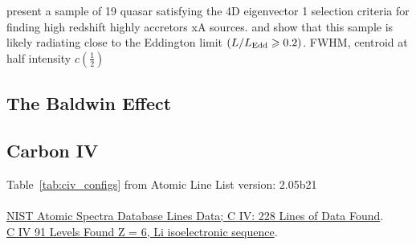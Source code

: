 \documentclass[a4paper,fleqn,usenatbib]{mnras}
\begin{document}
\citet{Martinez-Aldama2018} 
present a sample of 19 quasar satisfying the 
4D eigenvector 1 \citep[4DE1; ][]{Sulentic2000, Marziani2001} 
selection criteria for finding high redshift highly accretors xA sources. 
and show that this sample is likely radiating close to the Eddington limit 
$(L/L_{\rm Edd} \geq 0.2)$. 
FWHM, centroid at half intensity $c(\frac{1}{2})$


\subsection{The Baldwin Effect}



\subsection{Carbon IV}
Table~\ref{tab:civ_configs} from 
Atomic Line List version: 2.05b21  
\citep{Tunklev1997} \\

\citep[NIST; ][]{Reader2012AAS, Kramida2018}\\

%
%
% 

\href{https://physics.nist.gov/cgi-bin/ASD/lines1.pl?spectra=C+IV&limits_type=0&low_w=&upp_w=&unit=1&submit=Retrieve+Data&de=0&format=0&line_out=0&en_unit=0&output=0&bibrefs=1&page_size=15&show_obs_wl=1&show_calc_wl=1&unc_out=1&order_out=0&max_low_enrg=&show_av=2&max_upp_enrg=&tsb_value=0&min_str=&A_out=0&intens_out=on&max_str=&allowed_out=1&forbid_out=1&min_accur=&min_intens=&conf_out=on&term_out=on&enrg_out=on&J_out=on}{NIST Atomic Spectra Database Lines Data; C IV: 228 Lines of Data Found}. \\

\href{https://physics.nist.gov/cgi-bin/ASD/energy1.pl?encodedlist=XXT2&de=0&spectrum=C+IV&submit=Retrieve+Data&units=0&format=0&output=0&page_size=15&multiplet_ordered=0&conf_out=on&term_out=on&level_out=on&unc_out=1&j_out=on&lande_out=on&perc_out=on&biblio=on&temp=}{C IV   91 Levels Found
Z = 6, Li isoelectronic sequence}. \\
\end{document}
